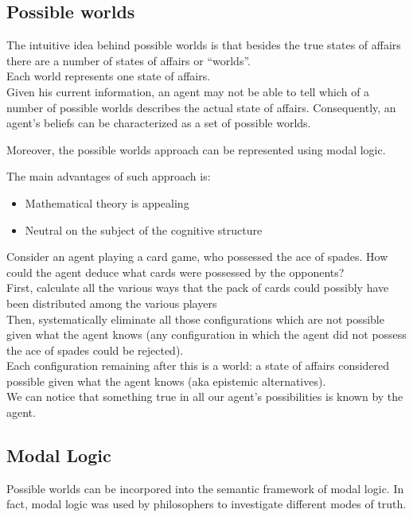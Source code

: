 \subsection{Possible worlds}
The intuitive idea behind possible worlds is that besides the true states of affairs there are a number of states of affairs or ``worlds''.\\
Each world represents one state of affairs.\\
Given his current information, an agent may not be able to tell which of a number of possible worlds describes the actual state of affairs. Consequently, an agent's beliefs can be characterized as a set of possible worlds.

Moreover, the possible worlds approach can be represented using modal logic.

The main advantages of such approach is:
\begin{itemize}
\item Mathematical theory is appealing
\item Neutral on the subject of the cognitive structure
\end{itemize}

Consider an agent playing a card game, who possessed the ace of spades. How could the agent deduce what cards were possessed by the opponents?\\
First, calculate all the various ways that the pack of cards could possibly have been distributed among the various players\\
Then, systematically eliminate all those configurations which are not possible given what the agent knows (any configuration in which the agent did not possess the ace of spades could be rejected).\\
Each configuration remaining after this is a world: a state of affairs considered possible given what the agent knows (aka epistemic alternatives).\\
We can notice that something true in all our agent's possibilities is known by the agent.
\subsection{Modal Logic}
Possible worlds can be incorpored into the semantic framework of modal logic.
In fact, modal logic was used by philosophers to investigate different modes of truth.

